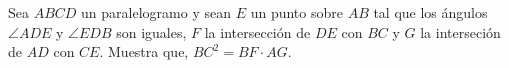 Sea $ABCD$ un paralelogramo y sean $E$ un punto sobre $AB$ tal que los ángulos $\angle ADE$ y $\angle EDB$ son iguales, $F$ la intersección de $DE$ con $BC$ y $G$ la interseción de $AD$ con $CE$. Muestra que, $BC^2 = BF \cdot AG$.